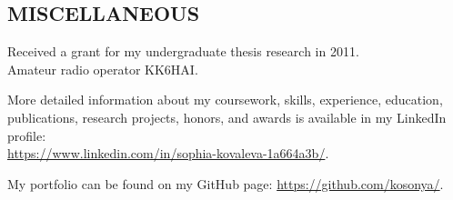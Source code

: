 \documentclass{res}
\begin{document}
\begin{resume}
\section{MISCELLANEOUS}

Received a grant for my undergraduate thesis research in 2011.\\
Amateur radio operator KK6HAI.

More detailed information about my coursework, skills, experience, education, publications, research projects, honors, and awards is available in my LinkedIn profile:\\ \href{https://www.linkedin.com/in/sophia-kovaleva-1a664a3b/}{https://www.linkedin.com/in/sophia-kovaleva-1a664a3b/}.

My portfolio can be found on my GitHub page: \href{https://github.com/kosonya/}{https://github.com/kosonya/}.

\end{resume}
\end{document}

